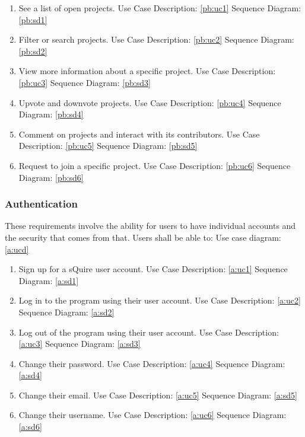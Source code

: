 \documentclass[twoside,letterpaper]{article}
\begin{document}
	\begin{enumerate}
		\item See a list of open projects.
			\subitem Use Case Description: \ref{pb:uc1}
			\subitem Sequence Diagram:  \ref{pb:sd1}
		\item Filter or search projects.
			\subitem Use Case Description: \ref{pb:uc2}
			\subitem Sequence Diagram:  \ref{pb:sd2}
		\item View more information about a specific project.
			\subitem Use Case Description: \ref{pb:uc3}
			\subitem Sequence Diagram:  \ref{pb:sd3}
		\item Upvote and downvote projects.
			\subitem Use Case Description: \ref{pb:uc4}
			\subitem Sequence Diagram:  \ref{pb:sd4}
		\item Comment on projects and interact with its contributors.
			\subitem Use Case Description: \ref{pb:uc5}
			\subitem Sequence Diagram:  \ref{pb:sd5}
		\item Request to join a specific project.
			\subitem Use Case Description: \ref{pb:uc6}
			\subitem Sequence Diagram:  \ref{pb:sd6}
	\end{enumerate}
	
	\subsubsection{Authentication}
	These requirements involve the ability for users to have individual accounts and the security that comes from that. Users shall be able to: \newline
	\noindent Use case diagram: \ref{a:ucd}
	
	
	\begin{enumerate}
		\item Sign up for a sQuire user account.
			\subitem Use Case Description: \ref{a:uc1}
			\subitem Sequence Diagram:  \ref{a:sd1}
		\item Log in to the program using their user account.
			\subitem Use Case Description: \ref{a:uc2}
			\subitem Sequence Diagram: \ref{a:sd2}
		\item Log out of the program using their user account.
			\subitem Use Case Description: \ref{a:uc3}
			\subitem Sequence Diagram: \ref{a:sd3}
		\item Change their password.
			\subitem Use Case Description: \ref{a:uc4}
			\subitem Sequence Diagram: \ref{a:sd4}
		\item Change their email.
			\subitem Use Case Description: \ref{a:uc5}
			\subitem Sequence Diagram: \ref{a:sd5}
		\item Change their username.
			\subitem Use Case Description: \ref{a:uc6}
			\subitem Sequence Diagram: \ref{a:sd6}
	\end{enumerate}
	
\end{document}
